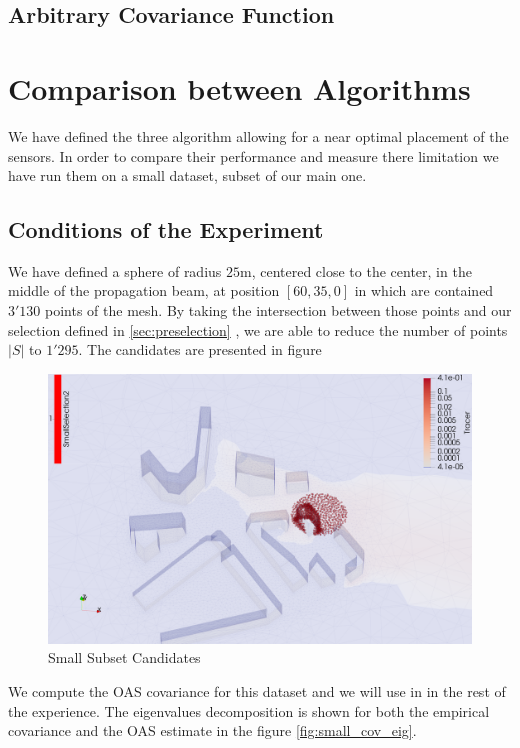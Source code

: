 \subsection{Arbitrary Covariance Function}



\section{Comparison between Algorithms}

We have defined the three algorithm allowing for a near optimal placement of the sensors. In order to compare their performance and measure there limitation we have run them on a small dataset, subset of our main one. 
\subsection{Conditions of the Experiment}

We have defined a sphere of radius $25$m, centered close to the center, in the middle of the propagation beam, at position $[60,35,0]$ in which are contained $3'130$ points of the mesh. By taking the intersection between those points and our selection defined in \ref{sec:preselection} , we are able to reduce the number of points $|S|$ to $1'295$.  The candidates are presented in figure \\

\begin{figure}[h!]
\centering
	\includegraphics[width=0.8\linewidth]{figures/CompAlg/3rd/non_centered_60.35.0/candidates_screenshot}
	\caption{Small Subset Candidates}
\end{figure}

We compute the OAS covariance for this dataset and we will use in in the rest of the experience. The eigenvalues decomposition is shown for both the empirical covariance and the OAS estimate in the figure \ref{fig:small_cov_eig}. \\

